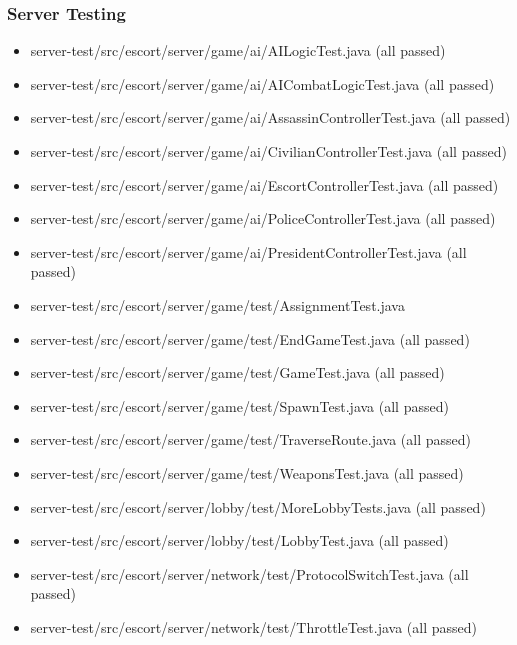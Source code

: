 \documentclass[12pt]{article}
\begin{document}
\subsubsection{Server Testing}
\begin{itemize}
\item server-test/src/escort/server/game/ai/AILogicTest.java (all passed)
\item server-test/src/escort/server/game/ai/AICombatLogicTest.java (all passed)
\item server-test/src/escort/server/game/ai/AssassinControllerTest.java (all passed)
\item server-test/src/escort/server/game/ai/CivilianControllerTest.java (all passed)
\item server-test/src/escort/server/game/ai/EscortControllerTest.java (all passed)
\item server-test/src/escort/server/game/ai/PoliceControllerTest.java (all passed)
\item server-test/src/escort/server/game/ai/PresidentControllerTest.java (all passed)
\item server-test/src/escort/server/game/test/AssignmentTest.java
\item server-test/src/escort/server/game/test/EndGameTest.java (all passed)
\item server-test/src/escort/server/game/test/GameTest.java (all passed)
\item server-test/src/escort/server/game/test/SpawnTest.java (all passed)
\item server-test/src/escort/server/game/test/TraverseRoute.java (all passed)
\item server-test/src/escort/server/game/test/WeaponsTest.java (all passed)
\item server-test/src/escort/server/lobby/test/MoreLobbyTests.java (all passed)
\item server-test/src/escort/server/lobby/test/LobbyTest.java (all passed)
\item server-test/src/escort/server/network/test/ProtocolSwitchTest.java (all passed)
\item server-test/src/escort/server/network/test/ThrottleTest.java (all passed)
\end{itemize}
\newpage
\end{document}
